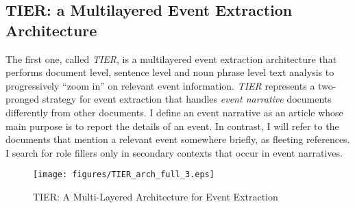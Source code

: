 \subsection{TIER: a Multilayered Event Extraction Architecture}
The first one, called {\it TIER}, 
is a multilayered event extraction architecture that performs 
document level, sentence level and noun phrase level text analysis to progressively
``zoom in'' on relevant event information. 
{\it TIER} represents a two-pronged strategy for event extraction that
handles {\it event narrative} documents differently from other
documents. I define an event
narrative as an article whose main purpose is to report the details
of an event.
In contrast, I will refer to the documents that mention a relevant
event somewhere briefly, as fleeting references.
I search for role fillers only in secondary contexts that occur in event narratives. 
\begin{figure}[b]
 \centering
 \texttt{[image: figures/TIER\_arch\_full\_3.eps]}
 \caption{TIER: A Multi-Layered Architecture for Event Extraction}
\label{TIER_flow_chart}
\end{figure} 


